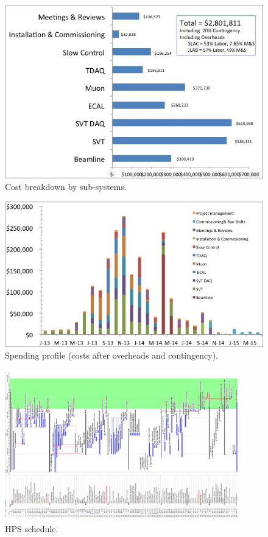 \begin{figure}[h]
\centering
\includegraphics[width=\textwidth]{cost_schedule/cost_systems.jpg} 
\caption{Cost breakdown by sub-systems.}
\label{fig:cost}
\end{figure}

\begin{figure}[h]
\centering
\includegraphics[width=\textwidth]{cost_schedule/spending.jpg} 
\caption{Spending profile (costs after overheads and contingency).}
\label{fig:spending}
\end{figure}

\begin{figure}[h]
\centering
\includegraphics[angle=-90,width=0.9\textwidth]{cost_schedule/HPSScheduleV60n} 
\caption{HPS schedule.}
\label{fig:schedule}
\end{figure}

